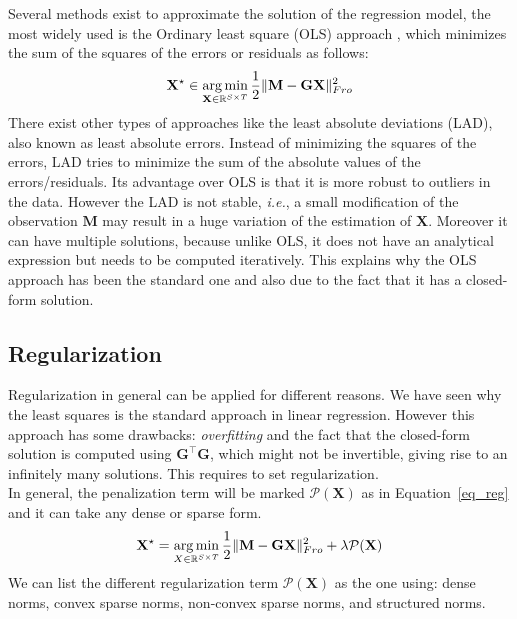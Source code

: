 Several methods exist to approximate the solution of the regression model, the most widely used is the Ordinary least square (OLS) approach \cite{legendre1805nouvelles}, which minimizes the sum of the squares of the errors or residuals as follows:
\begin{equation} \label{eq_ls}
	\mathbf{X^\star} \in \mathop{\mathrm{arg}\,\mathrm{min}}_{\mathbf{X}\in \mathbb{R}^{S\times T}}\frac{1}{2} \|\mathbf{M}-\mathbf{GX}\|_{Fro}^2
\end{equation}
There exist other types of approaches like the least absolute deviations (LAD), also known as least absolute errors. Instead of minimizing the squares of the errors, LAD tries to minimize the sum of the absolute values of the errors/residuals. Its advantage over OLS is that it is more robust to outliers in the data. However the LAD is not stable, \textit{i.e.}, a small modification of the observation $\mathbf{M}$ may result in a huge variation of the estimation of $\mathbf{X}$. Moreover it can have multiple solutions, because unlike OLS, it does not have an analytical expression but needs to be computed iteratively. This explains why the OLS approach has been the standard one and also due to the fact that it has a closed-form solution.

\subsection{Regularization}

Regularization in general can be applied for different reasons. We have seen why the least squares is the standard approach in linear regression. However this approach has some drawbacks: \textit{overfitting} and the fact that the closed-form solution is computed using $\mathbf{G}^\top\mathbf{G}$, which might not be invertible, giving rise to an infinitely many solutions. This requires to set regularization.\\

In general, the penalization term will be marked $\mathcal{P}(\mathbf{X})$ as in Equation~\eqref{eq_reg} and it can take any dense or sparse form.
\begin{equation} \label{eq_reg}
	\mathbf{X}^\star = \mathop{\mathrm{arg}\,\mathrm{min}}_{X\in\mathbb{R}^{S\times T}}\frac{1}{2}\|\mathbf{M}-\mathbf{GX}\|_{Fro}^2 + \lambda\mathcal{P}(\mathbf{X})
\end{equation}
We can list the different regularization term $\mathcal{P}(\mathbf{X})$ as the one using: dense norms, convex sparse norms, non-convex sparse norms, and structured norms.

